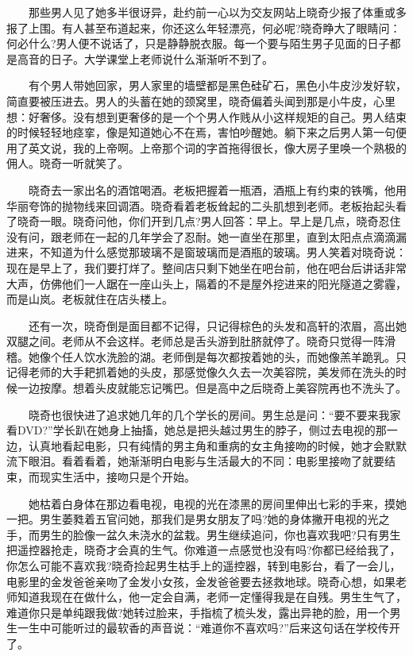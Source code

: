 \documentclass[12pt,UTF8]{ctexbook}
\begin{document}
　　那些男人见了她多半很讶异，赴约前一心以为交友网站上晓奇少报了体重或多报了上围。有人甚至布道起来，你还这么年轻漂亮，何必呢?晓奇睁大了眼睛问：何必什么?男人便不说话了，只是静静脱衣服。每一个要与陌生男子见面的日子都是高音的日子。大学课堂上老师说什么渐渐听不到了。

　　有个男人带她回家，男人家里的墙壁都是黑色硅矿石，黑色小牛皮沙发好软，简直要被压进去。男人的头蓄在她的颈窝里，晓奇偏着头闻到那是小牛皮，心里想：好奢侈。没有想到更奢侈的是一个个男人作贱从小这样规矩的自己。男人结束的时候轻轻地痉挛，像是知道她心不在焉，害怕吵醒她。躺下来之后男人第一句便用了英文说，我的上帝啊。上帝那个词的字首拖得很长，像大房子里唤一个熟极的佣人。晓奇一听就笑了。

　　晓奇去一家出名的酒馆喝酒。老板把握着一瓶酒，酒瓶上有约束的铁嘴，他用华丽夸饰的抛物线来回调酒。晓奇看着老板耸起的二头肌想到老师。老板抬起头看了晓奇一眼。晓奇问他，你们开到几点?男人回答：早上。早上是几点，晓奇忍住没有问，跟老师在一起的几年学会了忍耐。她一直坐在那里，直到太阳点点滴滴漏进来，不知道为什么感觉那玻璃不是窗玻璃而是酒瓶的玻璃。男人笑着对晓奇说：现在是早上了，我们要打烊了。整间店只剩下她坐在吧台前，他在吧台后讲话非常大声，仿佛他们一人踞在一座山头上，隔着的不是屋外挖进来的阳光隧道之雾霾，而是山岚。老板就住在店头楼上。

　　还有一次，晓奇倒是面目都不记得，只记得棕色的头发和高轩的浓眉，高出她双腿之间。老师从不会这样。老师总是舌头游到肚脐就停了。晓奇只觉得一阵滑稽。她像个任人饮水洗脸的湖。老师倒是每次都按着她的头，而她像羔羊跪乳。只记得老师的大手耙抓着她的头皮，那感觉像久久去一次美容院，美发师在洗头的时候一边按摩。想着头皮就能忘记嘴巴。但是高中之后晓奇上美容院再也不洗头了。

　　晓奇也很快进了追求她几年的几个学长的房间。男生总是问：\enquote{要不要来我家看DVD?}学长趴在她身上抽搐，她总是把头越过男生的脖子，侧过去电视的那一边，认真地看起电影，只有纯情的男主角和重病的女主角接吻的时候，她才会默默流下眼泪。看着看着，她渐渐明白电影与生活最大的不同：电影里接吻了就要结束，而现实生活中，接吻只是个开始。

　　她枯着白身体在那边看电视，电视的光在漆黑的房间里伸出七彩的手来，摸她一把。男生萎甤着五官问她，那我们是男女朋友了吗?她的身体撇开电视的光之手，而男生的脸像一盆久未浇水的盆栽。男生继续追问，你也喜欢我吧?只有男生把遥控器抢走，晓奇才会真的生气。你难道一点感觉也没有吗?你都已经给我了，你怎么可能不喜欢我?晓奇捡起男生枯手上的遥控器，转到电影台，看了一会儿，电影里的金发爸爸亲吻了金发小女孩，金发爸爸要去拯救地球。晓奇心想，如果老师知道我现在在做什么，他一定会自满，老师一定懂得我是在自残。男生生气了，难道你只是单纯跟我做?她转过脸来，手指梳了梳头发，露出异艳的脸，用一个男生一生中可能听过的最软香的声音说：\enquote{难道你不喜欢吗?}后来这句话在学校传开了。
\end{document}
